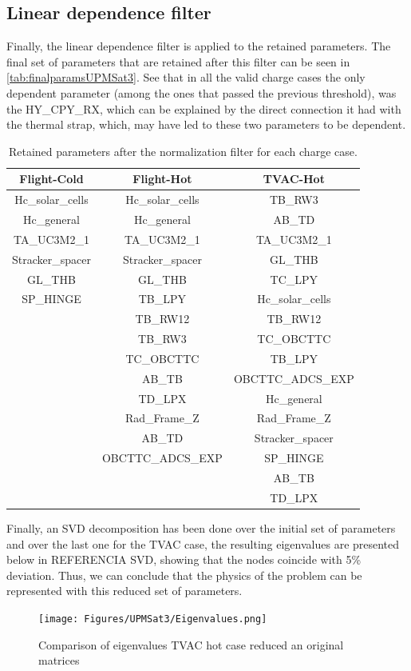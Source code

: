 \subsection{Linear dependence filter}
Finally, the linear dependence filter is applied to the retained parameters. The final set of parameters that are retained after this filter can be seen in \autoref{tab:finalparamsUPMSat3}. See that in all the valid charge cases the only dependent parameter (among the ones that passed the previous threshold), was the HY\_CPY\_RX, which can be explained by the direct connection it had with the thermal strap, which, may have led to these two parameters to be dependent.
\begin{table}[H]
    \centering
    \caption{Retained parameters after the normalization filter for each charge case.}
    \label{tab:finalparamsUPMSat3}
    \begin{tabular}{c c  c}
    \toprule
    \multicolumn{1}{c}{\textbf{Flight-Cold}} & \multicolumn{1}{c}{\textbf{Flight-Hot}}  & \multicolumn{1}{c}{\textbf{TVAC-Hot}} \\ \midrule
    Hc\_solar\_cells  & Hc\_solar\_cells  &  TB\_RW3  \\
    Hc\_general  & Hc\_general  &  AB\_TD  \\
    TA\_UC3M2\_1  & TA\_UC3M2\_1  &  TA\_UC3M2\_1  \\
    Stracker\_spacer  & Stracker\_spacer  &  GL\_THB  \\
    GL\_THB  & GL\_THB  &  TC\_LPY  \\
    SP\_HINGE  & TB\_LPY  &  Hc\_solar\_cells  \\
        & TB\_RW12  &  TB\_RW12  \\
        & TB\_RW3  &  TC\_OBCTTC  \\
        & TC\_OBCTTC  &  TB\_LPY  \\
        & AB\_TB  &  OBCTTC\_ADCS\_EXP  \\
        & TD\_LPX  &  Hc\_general  \\
        & Rad\_Frame\_Z  &  Rad\_Frame\_Z  \\
        & AB\_TD &  Stracker\_spacer  \\
        & OBCTTC\_ADCS\_EXP  &  SP\_HINGE  \\
        & & AB\_TB  \\
        & & TD\_LPX \\
        \bottomrule
    \end{tabular}
\end{table}

Finally, an SVD decomposition has been done over the initial set of parameters and over the last one for the TVAC case, the resulting eigenvalues are presented below in REFERENCIA SVD, showing that the nodes coincide with 5\% deviation. Thus, we can conclude that the physics of the problem can be represented with this reduced set of parameters.  

\begin{figure}[H]
    \centering
    \texttt{[image: Figures/UPMSat3/Eigenvalues.png]}
    \caption{Comparison of eigenvalues TVAC hot case reduced an original matrices}
    \label{fig:TCC-infmat}
\end{figure}